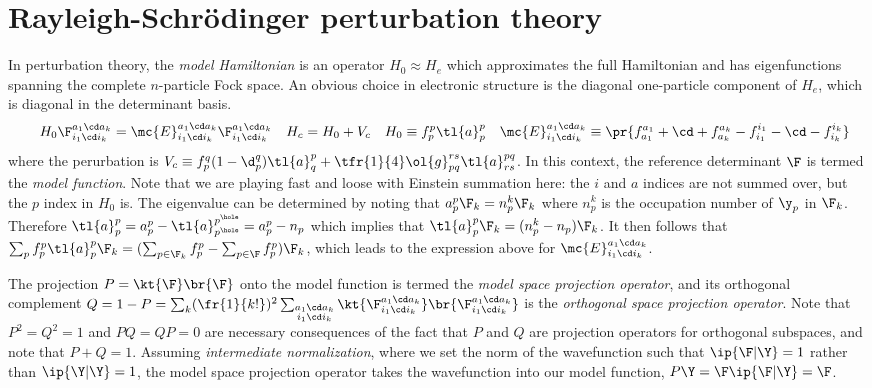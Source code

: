 \documentclass[11pt,fleqn]{article}
\numberwithin{equation}{section}
\begin{document}
\section{Rayleigh-Schr\"odinger perturbation theory}\label{sec:rspt}

\begin{dfn}\label{dfn:model-hamiltonian}
In perturbation theory, the \textit{model Hamiltonian} is an operator $H_0\approx H_e$ which approximates the full Hamiltonian and has eigenfunctions spanning the complete $n$-particle Fock space.
An obvious choice in electronic structure is the diagonal one-particle component of $H_e$, which is diagonal in the determinant basis.
\begin{align*}
&&
  H_0
  \F_{i_1\cd i_k}^{a_1\cd a_k}
=
  \mc{E}_{i_1\cd i_k}^{a_1\cd a_k}
  \F_{i_1\cd i_k}^{a_1\cd a_k}
&&
  H_c
=
  H_0
+
  V_c
&&
  H_0
\equiv
  f_p^p\tl{a}^p_p
&&
  \mc{E}_{i_1\cd i_k}^{a_1\cd a_k}
\equiv
\pr{
  f_{a_1}^{a_1}
+
  \cd
+
  f_{a_k}^{a_k}
-
  f_{i_1}^{i_1}
-
  \cd
-
  f_{i_k}^{i_k}
}
\end{align*}
where the perurbation is
$
  V_c
\equiv
  f_p^q(1-\d_p^q)
  \tl{a}^p_q
+
  \tfr{1}{4}
  \ol{g}_{pq}^{rs}
  \tl{a}^{pq}_{rs}
$.
In this context, the reference determinant $\F$ is termed the \textit{model function}.
Note that we are playing fast and loose with Einstein summation here: the $i$ and $a$ indices are not summed over, but the $p$ index in $H_0$ is.
The eigenvalue can be determined by noting that $a^p_p\F_k=n_p^k\F_k$ where $n_p^k$ is the occupation number of $\y_p$ in $\F_k$.
Therefore $\tl{a}^p_p=a^p_p-\tl{a}^{p^\hole}_{p^\hole}=a^p_p - n_p$ which implies that $\tl{a}^p_p\F_k=(n_p^k-n_p)\F_k$.
It then follows that
$
  \sum_p
  f_p^p
  \tl{a}^p_p
  \F_k
=
(
  \sum_{p\in \F_k}
  f_p^p
-
  \sum_{p\in \F}
  f_p^p
)
\F_k
$,
which leads to the expression above for $\mc{E}_{i_1\cd i_k}^{a_1\cd a_k}$.
\end{dfn}


\begin{dfn}\label{dfn:model-function}
The projection $P=\kt{\F}\br{\F}$ onto the model function is termed the \textit{model space projection operator}, and its orthogonal complement $Q=1-P=\sum_k(\fr{1}{k!})^2\sum_{\substack{a_1\cd a_k\\i_1\cd i_k}}\kt{\F_{i_1\cd i_k}^{a_1\cd a_k}}\br{\F_{i_1\cd i_k}^{a_1\cd a_k}}$ is the \textit{orthogonal space projection operator}.
Note that $P^2=Q^2=1$ and $PQ=QP=0$ are necessary consequences of the fact that $P$ and $Q$ are projection operators for orthogonal subspaces, and note that $P+Q=1$.
Assuming \textit{intermediate normalization}, where we set the norm of the wavefunction such that $\ip{\F|\Y}=1$ rather than $\ip{\Y|\Y}=1$, the model space projection operator takes the wavefunction into our model function, $P\Y=\F\ip{\F|\Y}=\F$.
\end{dfn}
\end{document}
